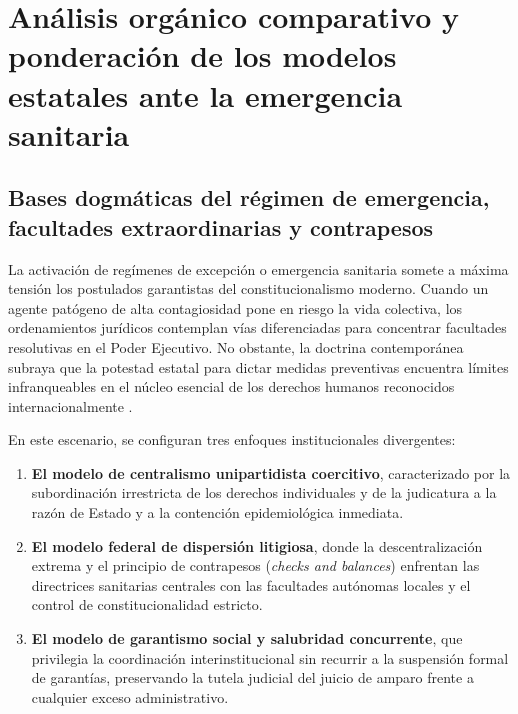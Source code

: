 \documentclass[12pt,spanish,letterpaper,oneside]{article}
\begin{document}
\section[An\'alisis org\'anico comparativo]{An\'alisis org\'anico comparativo y ponderaci\'on de los modelos estatales ante la emergencia sanitaria}

\subsection{Bases dogm\'aticas del r\'egimen de emergencia, facultades extraordinarias y contrapesos}

La activaci\'on de reg\'imenes de excepci\'on o emergencia sanitaria somete a m\'axima tensi\'on los postulados garantistas del constitucionalismo moderno. Cuando un agente pat\'ogeno de alta contagiosidad pone en riesgo la vida colectiva, los ordenamientos jur\'idicos contemplan v\'ias diferenciadas para concentrar facultades resolutivas en el Poder Ejecutivo. No obstante, la doctrina contempor\'anea subraya que la potestad estatal para dictar medidas preventivas encuentra l\'imites infranqueables en el n\'ucleo esencial de los derechos humanos reconocidos internacionalmente \citep{ferrajoli2001,carbonell2019}.

En este escenario, se configuran tres enfoques institucionales divergentes:
\begin{enumerate}
  \item \textbf{El modelo de centralismo unipartidista coercitivo}, caracterizado por la subordinaci\'on irrestricta de los derechos individuales y de la judicatura a la raz\'on de Estado y a la contenci\'on epidemiol\'ogica inmediata.
  \item \textbf{El modelo federal de dispersi\'on litigiosa}, donde la descentralizaci\'on extrema y el principio de contrapesos (\emph{checks and balances}) enfrentan las directrices sanitarias centrales con las facultades aut\'onomas locales y el control de constitucionalidad estricto.
  \item \textbf{El modelo de garantismo social y salubridad concurrente}, que privilegia la coordinaci\'on interinstitucional sin recurrir a la suspensi\'on formal de garant\'ias, preservando la tutela judicial del juicio de amparo frente a cualquier exceso administrativo.
\end{enumerate}
\end{document}
